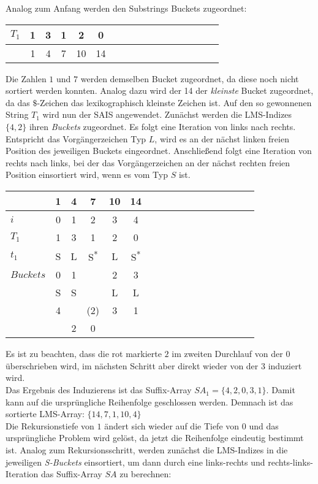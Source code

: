 \newpage \noindent Analog zum Anfang werden den Substrings Buckets zugeordnet:

\begin{center}
  \begin{tabular}{ | l | c | c | c | c | c | c | c | c | c | c | c | c | c | c | c | c | }
    \hline
        $T_1$ & 1 & 3 & 1 & 2 & 0 \\ \hline
              & 1 & 4 & 7 & 10 & 14  \\
    \hline
  \end{tabular}
\end{center}
\bigskip

\noindent Die Zahlen $1$ und $7$ werden demselben Bucket zugeordnet, da diese noch nicht sortiert werden konnten. Analog dazu wird der 14 der \textit{kleinste} Bucket zugeordnet, da das $\$$-Zeichen das lexikographisch kleinste Zeichen ist. Auf den so gewonnenen String $T_1$ wird nun der SAIS angewendet. Zunächst werden die LMS-Indizes $\{4, 2\}$ ihren \textit{Buckets} zugeordnet. Es folgt eine Iteration von links nach rechts. Entspricht das Vorgängerzeichen Typ $L$, wird es an der nächst linken freien Position des jeweiligen Buckets eingeordnet. Anschließend folgt eine Iteration von rechts nach links, bei der das Vorgängerzeichen an der nächst rechten freien Position einsortiert wird, wenn es vom Typ $S$ ist.

\begin{center}
  \begin{tabular}{ | l | c | c | c | c | c | c | c | c | c | c | c | c | c | c | c | c | }
    \hline
          & \tiny{1} & \tiny{4} & \tiny{7} & \tiny{10} & \tiny{14} \\ \hline
      $i$ & 0 & 1 & 2 & 3 & 4  \\ \hline
    $T_1$ & 1 & 3 & 1 & 2 & 0  \\ \hline
      $t_1$ & S & L & S\textsuperscript{*} & L & S\textsuperscript{*}  \\ \hline
$Buckets$ & 0 & \multicolumn{1}{c}{1} & & 2 & 3 \\ \hline
          & S & \multicolumn{1}{c}{S} & & L & L \\ \hline
          & 4 & & (2) & 3 & 1 \\ \hline
          & & 2 & 0 & & \\
    \hline
  \end{tabular}
\end{center}
\bigskip

\noindent Es ist zu beachten, dass die rot markierte $2$ im zweiten Durchlauf von der $0$ überschrieben wird, im nächsten Schritt aber direkt wieder von der $3$ induziert wird. \\
Das Ergebnis des Induzierens ist das Suffix-Array $SA_1 = \{4, 2, 0, 3, 1\}$. Damit kann auf die ursprüngliche Reihenfolge geschlossen werden. Demnach ist das sortierte LMS-Array: $\{14, 7, 1, 10, 4\}$ \\
Die Rekursionstiefe von $1$ ändert sich wieder auf die Tiefe von $0$ und das ursprüngliche Problem wird gelöst, da jetzt die Reihenfolge eindeutig bestimmt ist. Analog zum Rekursionsschritt, werden zunächst die LMS-Indizes in die jeweiligen \textit{S-Buckets} einsortiert, um dann durch eine links-rechts und rechts-links-Iteration das Suffix-Array $SA$ zu berechnen:


